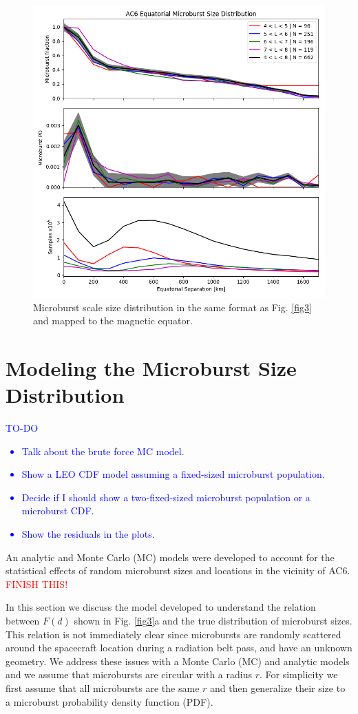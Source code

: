 \documentclass[draft]{agujournal2019}
\begin{document}
\begin{figure}
\includegraphics[width=\textwidth]{fig4.png}
\caption{Microburst scale size distribution in the same format as Fig. \ref{fig3} and mapped to the magnetic equator.} 
\label{fig4}
\end{figure}

\section{Modeling the Microburst Size Distribution}
\textcolor{blue}{
TO-DO
\begin{itemize}
\item Talk about the brute force MC model.
\item Show a LEO CDF model assuming a fixed-sized microburst population.
\item Decide if I should show a two-fixed-sized microburst population or a microburst CDF.
\item Show the residuals in the plots.
\end{itemize}
}

An analytic and Monte Carlo (MC) models were developed to account for the statistical effects of random microburst sizes and locations in the vicinity of AC6. \textcolor{red}{FINISH THIS!}

 In this section we discuss the model developed to understand the relation between $F(d)$ shown in Fig. \ref{fig3}a and the true distribution of microburst sizes. This relation is not immediately clear since microbursts are randomly scattered around the spacecraft location during a radiation belt pass, and have an unknown geometry. We address these issues with a Monte Carlo (MC) and analytic models and we assume that microbursts are circular with a radius $r$. For simplicity we first assume that all microbursts are the same $r$ and then generalize their size to a microburst probability density function (PDF). 
\end{document}
